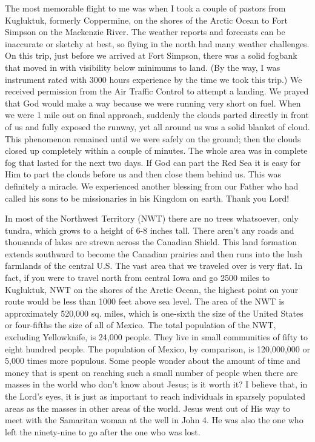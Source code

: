 \documentclass[oneside]{book}
\begin{document}
The most memorable flight to me was when I took a couple of pastors from Kugluktuk, formerly Coppermine, on the shores of the Arctic Ocean to Fort Simpson on the Mackenzie River. The weather reports and forecasts can be inaccurate or sketchy at best, so flying in the north had many weather challenges. On this trip, just before we arrived at Fort Simpson, there was a solid fogbank that moved in with visibility below minimums to land. (By the way, I was instrument rated with 3000 hours experience by the time we took this trip.) We received permission from the Air Traffic Control to attempt a landing. We prayed that God would make a way because we were running very short on fuel. When we were 1 mile out on final approach, suddenly the clouds parted directly in front of us and fully exposed the runway, yet all around us was a solid blanket of cloud. This phenomenon remained until we were safely on the ground; then the clouds closed up completely within a couple of minutes. The whole area was in complete fog that lasted for the next two days. If God can part the Red Sea it is easy for Him to part the clouds before us and then close them behind us. This was definitely a miracle. We experienced another blessing from our Father who had called his sons to be missionaries in his Kingdom on earth. Thank you Lord!

In most of the Northwest Territory (NWT) there are no trees whatsoever, only tundra, which grows to a height of 6-8 inches tall. There aren't any roads and thousands of lakes are strewn across the Canadian Shield. This land formation extends southward to become the Canadian prairies and then runs into the lush farmlands of the central U.S. The vast area that we traveled over is very flat. In fact, if you were to travel north from central Iowa and go 2500 miles to Kugluktuk, NWT on the shores of the Arctic Ocean, the highest point on your route would be less than 1000 feet above sea level. The area of the NWT is approximately 520,000 sq. miles, which is one-sixth the size of the United States or four-fifths the size of all of Mexico. The total population of the NWT, excluding Yellowknife, is 24,000 people. They live in small communities of fifty to eight hundred people. The population of Mexico, by comparison, is 120,000,000 or 5,000 times more populous. Some people wonder about the amount of time and money that is spent on reaching such a small number of people when there are masses in the world who don't know about Jesus; is it worth it? I believe that, in the Lord's eyes, it is just as important to reach individuals in sparsely populated areas as the masses in other areas of the world. Jesus went out of His way to meet with the Samaritan woman at the well in John 4. He was also the one who left the ninety-nine to go after the one who was lost.
\end{document}
